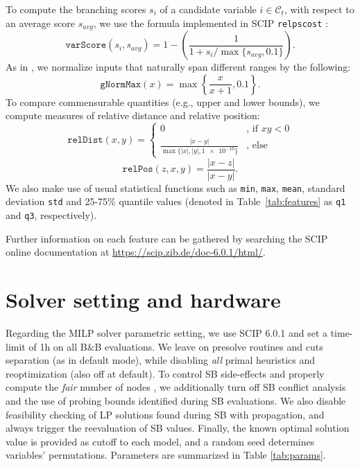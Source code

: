 \documentclass[letterpaper]{article} %
\begin{document}
To compute the branching scores $s_i$ of a candidate variable $i\in\mathcal{C}_t$, with respect to an average score $s_\mathit{avg}$, we use the formula implemented in SCIP \texttt{relpscost} \cite{relpscost}:
\begin{equation*}
    \texttt{varScore}(s_i, s_\mathit{avg}) = 1 - \left(\frac{1}{1 + s_i/\max\{s_\mathit{avg}, 0.1\}}\right).
\end{equation*}
As in \cite{Achterberg2007}, we normalize inputs that naturally span different ranges by the following:
\begin{equation*}
    \texttt{gNormMax}(x) = \max\left\{\frac{x}{x+1}, 0.1\right\}.
\end{equation*}
To compare commensurable quantities (e.g., upper and lower bounds), we compute measures of relative distance and relative position:
\begin{equation*}
    \texttt{relDist}(x, y) = \begin{cases}
    0 & \text{, if } xy<0 \\
    \frac{|x-y|}{\max\{|x|, |y|, \num{1e-10}\}} & \text{, else}
    \end{cases}
\end{equation*}
\begin{equation*}
    \texttt{relPos}(z,x,y) = \frac{|x-z|}{|x-y|}.
\end{equation*}
We also make use of usual statistical functions such as \texttt{min}, \texttt{max}, \texttt{mean}, standard deviation \texttt{std} and 25-75\% quantile values (denoted in Table~\ref{tab:features} as \texttt{q1} and \texttt{q3}, respectively).

Further information on each feature can be gathered by searching the SCIP online documentation at \url{https://scip.zib.de/doc-6.0.1/html/}.

\section{Solver setting and hardware}
\label{app:setting}

Regarding the MILP solver parametric setting, we use SCIP 6.0.1 and set a time-limit of 1h on all B\&B evaluations. We leave on presolve routines and cuts separation (as in default mode), while disabling \emph{all} primal heuristics and reoptimization (also off at default). To control SB side-effects and properly compute the \emph{fair} number of nodes \cite{gamrath_impact}, we additionally turn off SB conflict analysis and the use of probing bounds identified during SB evaluations. We also disable feasibility checking of LP solutions found during SB with propagation, and always trigger the reevaluation of SB values. Finally, the known optimal solution value is provided as cutoff to each model, and a random seed determines variables' permutations. Parameters are summarized in Table \ref{tab:params}.
\end{document}
